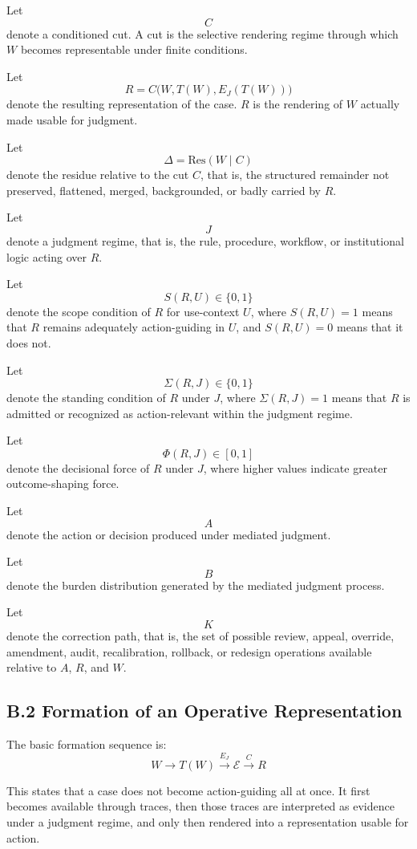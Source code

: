 \documentclass[11pt]{article}
\begin{document}
Let
\[
C
\]
denote a conditioned cut. A cut is the selective rendering regime through which \(W\) becomes representable under finite conditions.

Let
\[
R = C\big(W,T(W),E_J(T(W))\big)
\]
denote the resulting representation of the case. \(R\) is the rendering of \(W\) actually made usable for judgment.

Let
\[
\Delta = \mathrm{Res}(W \mid C)
\]
denote the residue relative to the cut \(C\), that is, the structured remainder not preserved, flattened, merged, backgrounded, or badly carried by \(R\).

Let
\[
J
\]
denote a judgment regime, that is, the rule, procedure, workflow, or institutional logic acting over \(R\).

Let
\[
S(R,U)\in\{0,1\}
\]
denote the scope condition of \(R\) for use-context \(U\), where \(S(R,U)=1\) means that \(R\) remains adequately action-guiding in \(U\), and \(S(R,U)=0\) means that it does not.

Let
\[
\Sigma(R,J)\in\{0,1\}
\]
denote the standing condition of \(R\) under \(J\), where \(\Sigma(R,J)=1\) means that \(R\) is admitted or recognized as action-relevant within the judgment regime.

Let
\[
\Phi(R,J)\in[0,1]
\]
denote the decisional force of \(R\) under \(J\), where higher values indicate greater outcome-shaping force.

Let
\[
A
\]
denote the action or decision produced under mediated judgment.

Let
\[
B
\]
denote the burden distribution generated by the mediated judgment process.

Let
\[
K
\]
denote the correction path, that is, the set of possible review, appeal, override, amendment, audit, recalibration, rollback, or redesign operations available relative to \(A\), \(R\), and \(W\).

\subsection*{B.2 Formation of an Operative Representation}

The basic formation sequence is:
\[
W \longrightarrow T(W) \xrightarrow{E_J} \mathcal{E} \xrightarrow{C} R
\]

This states that a case does not become action-guiding all at once. It first becomes available through traces, then those traces are interpreted as evidence under a judgment regime, and only then rendered into a representation usable for action.
\end{document}
